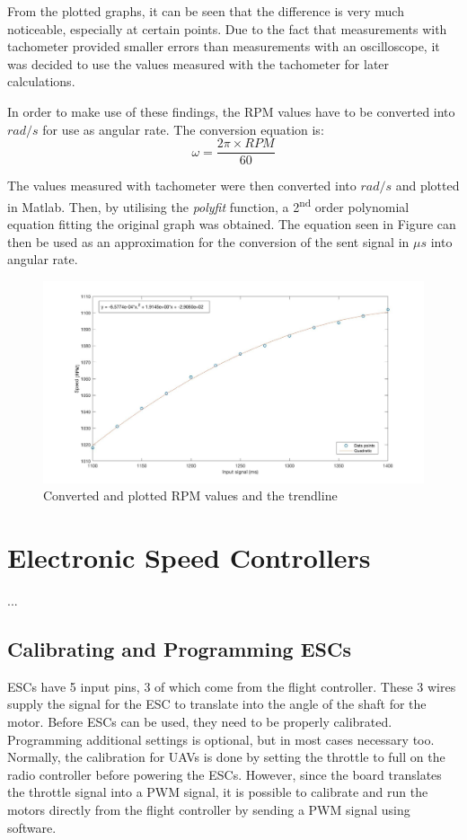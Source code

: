 From the plotted graphs, it can be seen that the difference is very much noticeable, especially at certain points. Due to the fact that measurements with tachometer provided smaller errors than measurements with an oscilloscope, it was decided to use the values measured with the tachometer for later calculations.

In order to make use of these findings, the RPM values have to be converted into $rad/s$ for use as angular rate. The conversion equation is:
\begin{equation}
\label{RPMConvert}
	\omega = \frac{2\pi \times RPM}{60}
\end{equation}

The values measured with tachometer were then converted into $rad/s$ and plotted in Matlab. Then, by utilising the \textit{polyfit} function, a 2\textsuperscript{nd} order polynomial equation fitting the original graph was obtained. The equation seen in Figure \label{RadsTrendline} can then be used as an approximation for the conversion of the sent signal in $\mu s$ into angular rate.

\begin{figure}[H]
  \centering
    \includegraphics[width=1\textwidth]{images/mstorpm.jpg}
	\caption{Converted and plotted RPM values and the trendline}
	\label{RadsTrendline}
\end{figure}

\section{Electronic Speed Controllers}

...

\subsection{Calibrating and Programming ESCs}
ESCs have 5 input pins, 3 of which come from the flight controller. These 3 wires supply the signal for the ESC to translate into the angle of the shaft for the motor. Before ESCs can be used, they need to be properly calibrated. Programming additional settings is optional, but in most cases necessary too. Normally, the calibration for UAVs is done by setting the throttle to full on the radio controller before powering the ESCs. However, since the board translates the throttle signal into a PWM signal, it is possible to calibrate and run the motors directly from the flight controller by sending a PWM signal using software.

